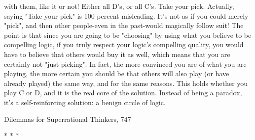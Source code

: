 with them, like it or not! Either all D's, or all C's. Take your pick.
        Actually, saying "Take your pick" is 100 percent misleading. It's not as if you
could merely "pick", and then other people-even in the past-would magically follow
suit! The point is that since you are going to be "choosing" by using what you believe
to be compelling logic, if you truly respect your logic's compelling quality, you would
have to believe that others would buy it as well, which means that you are certainly
not "just picking". In fact, the more convinced you are of what you are playing, the
more certain you should be that others will also play (or have already played) the
same way, and for the same reasons. This holds whether you play C or D, and it is the
real core of the solution. Instead of being a paradox, it's a self-reinforcing solution: a
benign circle of logic.




Dilemmas for Superrational Thinkers,                                                  747

                                         *   *   *


